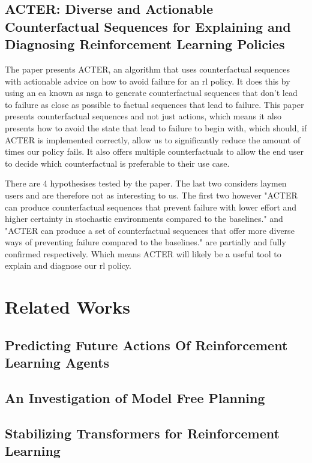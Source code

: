 \documentclass[UKenglish]{uiomasterthesis}
\begin{document}
\subsection{ACTER: Diverse and Actionable Counterfactual Sequences for Explaining and Diagnosing Reinforcement Learning Policies}
\label{sec:acter}
The paper presents ACTER, an algorithm that uses counterfactual sequences with actionable advice on how to avoid failure for an \ac{rl} policy. It does this by using an \ac{ea} known as \ac{nsga} to generate counterfactual sequences that don't lead to failure as close as possible to factual sequences that lead to failure. This paper presents counterfactual sequences and not just actions, which means it also presents how to avoid the state that lead to failure to begin with, which should, if ACTER is implemented correctly, allow us to significantly reduce the amount of times our policy fails. It also offers multiple counterfactuals to allow the end user to decide which counterfactual is preferable to their use case.

There are 4 hypothesises tested by the paper. The last two considers laymen users and are therefore not as interesting to us. The first two however "ACTER can produce counterfactual sequences that prevent failure with lower effort and higher certainty in stochastic environments compared to the baselines." and "ACTER can produce a set of counterfactual sequences that offer more diverse ways of preventing failure compared to the baselines." are partially and fully confirmed respectively. Which means ACTER will likely be a useful tool to explain and diagnose our \ac{rl} policy.


\section{Related Works}
\subsection{Predicting Future Actions Of Reinforcement Learning Agents}
\subsection{An Investigation of Model Free Planning}
\subsection{Stabilizing Transformers for Reinforcement Learning}

\medskip
\end{document}
